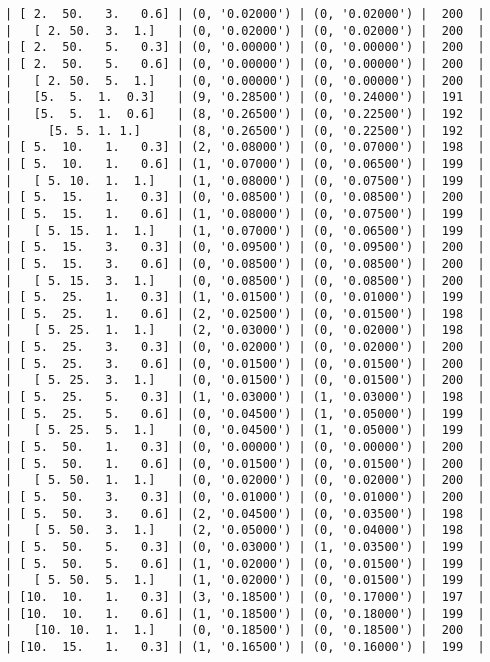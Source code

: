 \documentclass{article}
\begin{document}
\begin{verbatim}
| [ 2.  50.   3.   0.6] | (0, '0.02000') | (0, '0.02000') |  200  |
|   [ 2. 50.  3.  1.]   | (0, '0.02000') | (0, '0.02000') |  200  |
| [ 2.  50.   5.   0.3] | (0, '0.00000') | (0, '0.00000') |  200  |
| [ 2.  50.   5.   0.6] | (0, '0.00000') | (0, '0.00000') |  200  |
|   [ 2. 50.  5.  1.]   | (0, '0.00000') | (0, '0.00000') |  200  |
|   [5.  5.  1.  0.3]   | (9, '0.28500') | (0, '0.24000') |  191  |
|   [5.  5.  1.  0.6]   | (8, '0.26500') | (0, '0.22500') |  192  |
|     [5. 5. 1. 1.]     | (8, '0.26500') | (0, '0.22500') |  192  |
| [ 5.  10.   1.   0.3] | (2, '0.08000') | (0, '0.07000') |  198  |
| [ 5.  10.   1.   0.6] | (1, '0.07000') | (0, '0.06500') |  199  |
|   [ 5. 10.  1.  1.]   | (1, '0.08000') | (0, '0.07500') |  199  |
| [ 5.  15.   1.   0.3] | (0, '0.08500') | (0, '0.08500') |  200  |
| [ 5.  15.   1.   0.6] | (1, '0.08000') | (0, '0.07500') |  199  |
|   [ 5. 15.  1.  1.]   | (1, '0.07000') | (0, '0.06500') |  199  |
| [ 5.  15.   3.   0.3] | (0, '0.09500') | (0, '0.09500') |  200  |
| [ 5.  15.   3.   0.6] | (0, '0.08500') | (0, '0.08500') |  200  |
|   [ 5. 15.  3.  1.]   | (0, '0.08500') | (0, '0.08500') |  200  |
| [ 5.  25.   1.   0.3] | (1, '0.01500') | (0, '0.01000') |  199  |
| [ 5.  25.   1.   0.6] | (2, '0.02500') | (0, '0.01500') |  198  |
|   [ 5. 25.  1.  1.]   | (2, '0.03000') | (0, '0.02000') |  198  |
| [ 5.  25.   3.   0.3] | (0, '0.02000') | (0, '0.02000') |  200  |
| [ 5.  25.   3.   0.6] | (0, '0.01500') | (0, '0.01500') |  200  |
|   [ 5. 25.  3.  1.]   | (0, '0.01500') | (0, '0.01500') |  200  |
| [ 5.  25.   5.   0.3] | (1, '0.03000') | (1, '0.03000') |  198  |
| [ 5.  25.   5.   0.6] | (0, '0.04500') | (1, '0.05000') |  199  |
|   [ 5. 25.  5.  1.]   | (0, '0.04500') | (1, '0.05000') |  199  |
| [ 5.  50.   1.   0.3] | (0, '0.00000') | (0, '0.00000') |  200  |
| [ 5.  50.   1.   0.6] | (0, '0.01500') | (0, '0.01500') |  200  |
|   [ 5. 50.  1.  1.]   | (0, '0.02000') | (0, '0.02000') |  200  |
| [ 5.  50.   3.   0.3] | (0, '0.01000') | (0, '0.01000') |  200  |
| [ 5.  50.   3.   0.6] | (2, '0.04500') | (0, '0.03500') |  198  |
|   [ 5. 50.  3.  1.]   | (2, '0.05000') | (0, '0.04000') |  198  |
| [ 5.  50.   5.   0.3] | (0, '0.03000') | (1, '0.03500') |  199  |
| [ 5.  50.   5.   0.6] | (1, '0.02000') | (0, '0.01500') |  199  |
|   [ 5. 50.  5.  1.]   | (1, '0.02000') | (0, '0.01500') |  199  |
| [10.  10.   1.   0.3] | (3, '0.18500') | (0, '0.17000') |  197  |
| [10.  10.   1.   0.6] | (1, '0.18500') | (0, '0.18000') |  199  |
|   [10. 10.  1.  1.]   | (0, '0.18500') | (0, '0.18500') |  200  |
| [10.  15.   1.   0.3] | (1, '0.16500') | (0, '0.16000') |  199  |

\end{verbatim}
\end{document}

